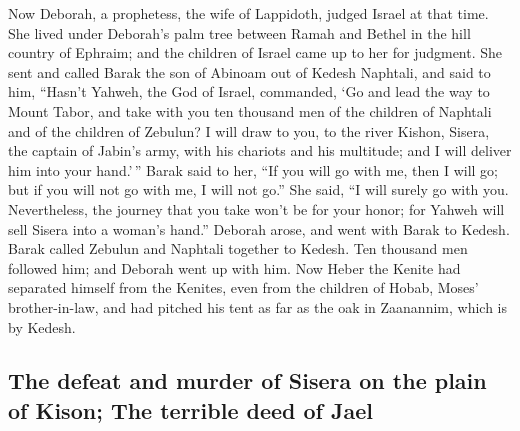  Now Deborah, a prophetess, the wife of Lappidoth, judged
Israel at that time.  She lived under Deborah's palm tree
between Ramah and Bethel in the hill country of Ephraim; and the
children of Israel came up to her for judgment.  She sent
and called Barak the son of Abinoam out of Kedesh Naphtali, and said to
him, ``Hasn't Yahweh, the God of Israel, commanded, `Go and lead the way
to Mount Tabor, and take with you ten thousand men of the children of
Naphtali and of the children of Zebulun?  I will draw to
you, to the river Kishon, Sisera, the captain of Jabin's army, with his
chariots and his multitude; and I will deliver him into your hand.'\,''
 Barak said to her, ``If you will go with me, then I will
go; but if you will not go with me, I will not go.''  She
said, ``I will surely go with you. Nevertheless, the journey that you
take won't be for your honor; for Yahweh will sell Sisera into a woman's
hand.'' Deborah arose, and went with Barak to Kedesh. 
Barak called Zebulun and Naphtali together to Kedesh. Ten thousand men
followed him; and Deborah went up with him.  Now Heber
the Kenite had separated himself from the Kenites, even from the
children of Hobab, Moses' brother-in-law, and had pitched his tent as
far as the oak in Zaanannim, which is by Kedesh.

\hypertarget{the-defeat-and-murder-of-sisera-on-the-plain-of-kison-the-terrible-deed-of-jael}{%
\subsection{The defeat and murder of Sisera on the plain of Kison; The
terrible deed of
Jael}\label{the-defeat-and-murder-of-sisera-on-the-plain-of-kison-the-terrible-deed-of-jael}}

